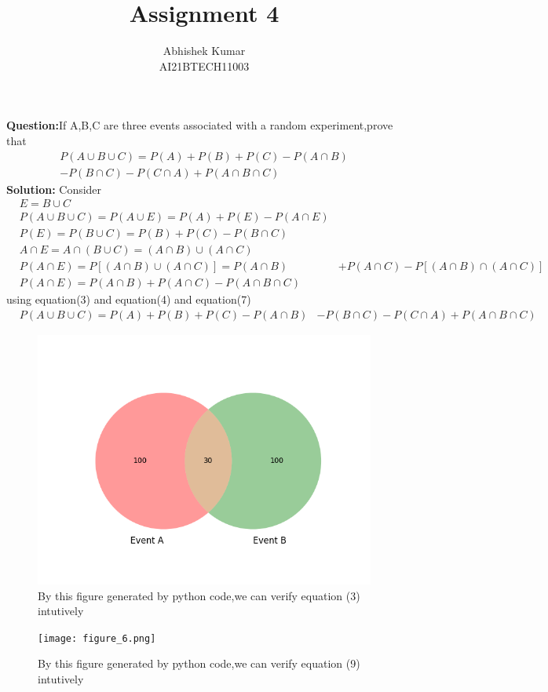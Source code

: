 \documentclass[journal, 8pt, twocolumn]{IEEEtran}
\title{Assignment 4 \\}
\author{Abhishek Kumar\\AI21BTECH11003}
\begin{document}
	\maketitle
	\textbf{Question:}If A,B,C are three events associated with a random experiment,prove that 
	\begin{align}
	P(A \cup B \cup C) = P(A)+P(B)+P(C)-P(A \cap B) \nonumber \\-P(B \cap C)-P(C \cap A)+P(A \cap B \cap C)
	\end{align}
	\textbf{Solution:}
	Consider
	\begin{align}
	   &E=B \cup C \\ 
	   &P(A \cup B \cup C)=P(A \cup E)=P(A)+P(E)-P(A \cap E)\\
    &P(E) = P(B \cup C)=P(B)+P(C)-P(B \cap C)\\
    &A \cap E = A \cap (B \cup C) = (A \cap B) \cup (A \cap C)\\
    &P(A \cap E)=P[(A \cap B) \cup (A \cap C)]=P(A \cap B)
    &+P(A \cap C)-P[(A \cap B) \cap (A \cap C)]\\
    &P(A \cap E) = P(A \cap B)+P(A \cap C) -P(A \cap B \cap C)
	\end{align}
	using equation(3) and equation(4) and equation(7)
	\begin{align}
	&P(A \cup B \cup C)=P(A)+P(B)+P(C)-P(A \cap B)
	&-P(B \cap C)-P(C \cap A)+P(A \cap B \cap C)
	\end{align}
	
	  \begin{figure}[h]
	    \centering
	    \includegraphics[scale=0.5]{figure_5.png}
	    \caption{By this figure generated by python code,we can verify equation (3) intutively}
	    \label{fig:my_label}
	\end{figure}
	
\begin{figure}[h]
	    \centering
	    \texttt{[image: figure\_6.png]}
	    \caption{By this figure generated by python code,we can verify equation (9) intutively}
	    \label{fig:my_label}
	\end{figure}
\end{document}
